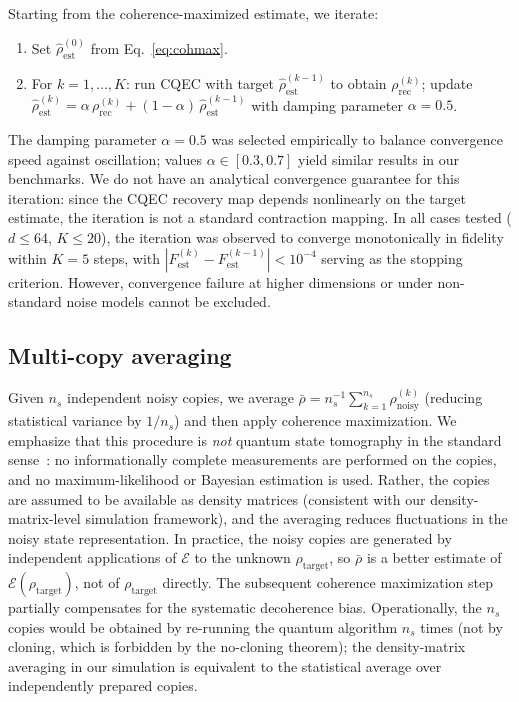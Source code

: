 \documentclass[12pt,a4paper]{article}
\newcommand{\EE}{\mathcal{E}}
\newcommand{\Fest}{F_\mathrm{est}}
\newcommand{\rhot}{\rho_\mathrm{target}}
\newcommand{\rhon}{\rho_\mathrm{noisy}}
\newcommand{\rhor}{\rho_\mathrm{rec}}
\newcommand{\rhoe}{\hat{\rho}_\mathrm{est}}
\begin{document}
Starting from the coherence-maximized estimate, we iterate:
\begin{enumerate}
\item Set $\rhoe^{(0)}$ from Eq.~\eqref{eq:cohmax}.
\item For $k = 1, \ldots, K$: run CQEC with target $\rhoe^{(k-1)}$ to obtain $\rhor^{(k)}$; update $\rhoe^{(k)} = \alpha\,\rhor^{(k)} + (1-\alpha)\,\rhoe^{(k-1)}$ with damping parameter $\alpha = 0.5$.
\end{enumerate}
The damping parameter $\alpha = 0.5$ was selected empirically to balance convergence speed against oscillation; values $\alpha \in [0.3, 0.7]$ yield similar results in our benchmarks.
We do not have an analytical convergence guarantee for this iteration: since the CQEC recovery map depends nonlinearly on the target estimate, the iteration is not a standard contraction mapping.
In all cases tested ($d \leq 64$, $K \leq 20$), the iteration was observed to converge monotonically in fidelity within $K = 5$ steps, with $|\Fest^{(k)} - \Fest^{(k-1)}| < 10^{-4}$ serving as the stopping criterion.
However, convergence failure at higher dimensions or under non-standard noise models cannot be excluded.

\subsection{Multi-copy averaging}
\label{sec:multicopy}

Given $n_s$ independent noisy copies, we average $\bar\rho = n_s^{-1}\sum_{k=1}^{n_s} \rhon^{(k)}$ (reducing statistical variance by $1/n_s$) and then apply coherence maximization.
We emphasize that this procedure is \emph{not} quantum state tomography in the standard sense~\cite{Hradil1997,Haah2017}: no informationally complete measurements are performed on the copies, and no maximum-likelihood or Bayesian estimation is used.
Rather, the copies are assumed to be available as density matrices (consistent with our density-matrix-level simulation framework), and the averaging reduces fluctuations in the noisy state representation.
In practice, the noisy copies are generated by independent applications of $\EE$ to the unknown $\rhot$, so $\bar\rho$ is a better estimate of $\EE(\rhot)$, not of $\rhot$ directly.
The subsequent coherence maximization step partially compensates for the systematic decoherence bias.
Operationally, the $n_s$ copies would be obtained by re-running the quantum algorithm $n_s$ times (not by cloning, which is forbidden by the no-cloning theorem); the density-matrix averaging in our simulation is equivalent to the statistical average over independently prepared copies.
\end{document}
